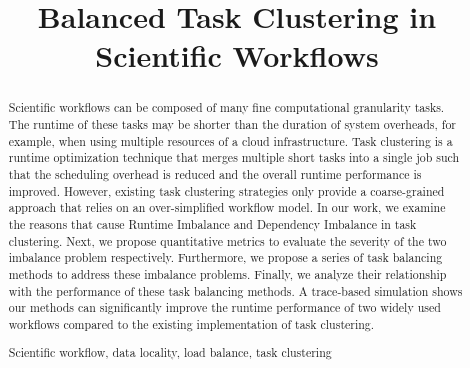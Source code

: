 \documentclass[final]{IEEEtran}
\begin{document}
\title{Balanced Task Clustering in Scientific Workflows}


\author{
}

\maketitle

\begin{abstract}
Scientific workflows can be composed of many fine computational granularity tasks. The runtime of these tasks may be shorter than the duration of system overheads, for example, when using multiple resources of a cloud infrastructure. Task clustering is a runtime optimization technique that merges multiple short tasks into a single job such that the scheduling overhead is reduced and the overall runtime performance is improved. However, existing task clustering strategies only provide a coarse-grained approach that relies on an over-simplified workflow model. In our work, we examine the reasons that cause Runtime Imbalance and Dependency Imbalance in task clustering. Next, we propose quantitative metrics to evaluate the severity of the two imbalance problem respectively. Furthermore, we propose a series of task balancing methods to address these imbalance problems. Finally, we analyze their relationship with the performance of these task balancing methods. A trace-based simulation shows our methods can significantly improve the runtime performance of two widely used workflows compared to the existing implementation of task clustering.

\begin{IEEEkeywords}
Scientific workflow, data locality, load balance, task clustering
\end{IEEEkeywords}
\end{abstract}
\end{document}

